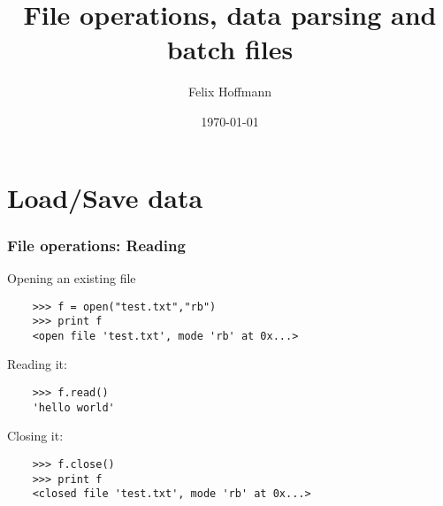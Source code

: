 \documentclass[xcolor=table,10pt, handout]{beamer}
\title {File operations, data parsing and batch files}
\author[Felix Hoffmann]{Felix Hoffmann}
\institute[BCF]{Bernstein Center Freiburg}
\date{\today}
\begin{document}









\section{Load/Save data}

\begin{frame}[fragile]

  \frametitle{File operations: Reading}

  Opening an existing file 

  \begin{verbatim}
    >>> f = open("test.txt","rb")
    >>> print f
    <open file 'test.txt', mode 'rb' at 0x...>
  \end{verbatim}
  \bigskip
  \pause
  Reading it:
  \begin{verbatim}
    >>> f.read()
    'hello world'
  \end{verbatim}
  \pause
  \bigskip
  Closing it:
  \begin{verbatim}
    >>> f.close()
    >>> print f
    <closed file 'test.txt', mode 'rb' at 0x...>
  \end{verbatim}

\end{frame}
\end{document}
